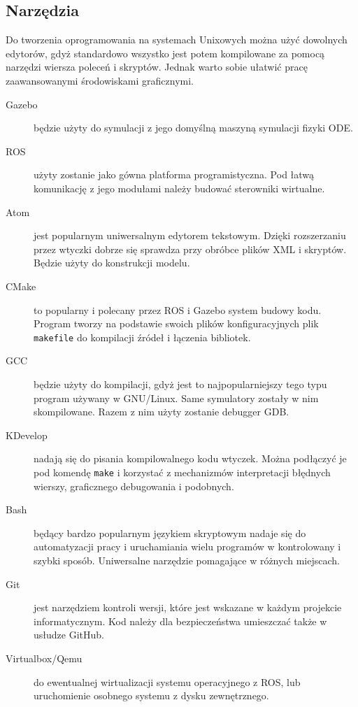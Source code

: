 	\subsection{Narzędzia}
	Do tworzenia oprogramowania na systemach Unixowych można użyć dowolnych edytorów, gdyż standardowo wszystko jest potem kompilowane za pomocą narzędzi wiersza poleceń i skryptów.
	Jednak warto sobie ułatwić pracę zaawansowanymi środowiskami graficznymi.
	\begin{description}
	\item[Gazebo] będzie użyty do symulacji z jego domyślną maszyną symulacji fizyki ODE.
	\item[ROS] użyty zostanie jako gówna platforma programistyczna. Pod łatwą komunikację z jego modułami należy budować sterowniki wirtualne.
	\item[Atom] jest popularnym uniwersalnym edytorem tekstowym. Dzięki rozszerzaniu przez wtyczki dobrze się sprawdza przy obróbce plików XML i skryptów.
	Będzie użyty do konstrukcji modelu.
	\item[CMake] to popularny i polecany przez ROS i Gazebo system budowy kodu. Program tworzy na podstawie swoich plików konfiguracyjnych plik \texttt{makefile} do kompilacji źródeł i łączenia bibliotek.
	\item[GCC] będzie użyty do kompilacji, gdyż jest to najpopularniejszy tego typu program używany w GNU/Linux. Same symulatory zostały w nim skompilowane.
	Razem z nim użyty zostanie debugger GDB. 
	\item[KDevelop] nadają się do pisania kompilowalnego kodu wtyczek. Można podłączyć je pod komendę \texttt{make} i korzystać z mechanizmów interpretacji błędnych wierszy, graficznego debugowania i podobnych.
	\item[Bash] będący bardzo popularnym językiem skryptowym nadaje się do automatyzacji pracy i uruchamiania wielu programów w kontrolowany i szybki sposób.
	Uniwersalne narzędzie pomagające w różnych miejscach.
	\item[Git] jest narzędziem kontroli wersji, które jest wskazane w każdym projekcie informatycznym. Kod należy dla bezpieczeństwa umieszczać także w usłudze GitHub.
	\item[Virtualbox/Qemu] do ewentualnej wirtualizacji systemu operacyjnego z ROS, lub uruchomienie osobnego systemu z dysku zewnętrznego.
	\end{description}


